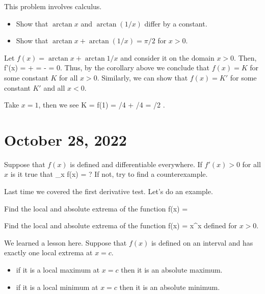 \documentclass[11pt]{amsart}
\begin{document}
\newpage

\begin{eg} 
This problem involves calculus. 
\begin{itemize}
\item Show that $\arctan x$ and $\arctan (1/x)$ differ by a constant. 
\item Show that $\arctan x + \arctan(1/x) = \pi/2$ for $x > 0$. 
\end{itemize} 
\end{eg} 

\newpage 

Let $f(x) = \arctan x + \arctan 1/x$ and consider it on the domain $x > 0$. 
Then, 
\beqn
f'(x) =  +  =  -  = 0.
\eeqn
Thus, by the corollary above we conclude that $f(x) = K$ for some constant $K$ for all $x > 0$. 
Similarly, we can show that $f(x) = K'$ for some constant $K'$ and all $x < 0$. 

Take $x = 1$, then we see
\beqn
K = f(1) = \pi/4 + \pi/4 = \pi/2 .
\eeqn 

\newpage

\section*{October 28, 2022} 

\begin{eg} 
Suppose that $f(x)$ is defined and differentiable everywhere. 
If $f'(x) > 0$ for all $x$ is it true that 
\beqn
\lim_{x \to \infty} f(x) = \infty ?
\eeqn
If not, try to find a counterexample. 
\end{eg} 

\vspace{5cm} 

Last time we covered the first derivative test.
Let's do an example. 
\begin{eg} 
Find the local and absolute extrema of the function 
\beqn
f(x) =  
\eeqn
\end{eg} 

\newpage 

\begin{eg} 
Find the local and absolute extrema of the function
\beqn
f(x) = x^x
\eeqn 
defined for $x > 0$. 
\end{eg} 
\vspace{5cm} 

We learned a lesson here.
Suppose that $f(x)$ is defined on an interval and has exactly one local extrema at $x = c$. 
\begin{itemize}
\item if it is a local maximum at $x=c$ then it is an absolute maximum. 
\item if it is a local minimum at $x=c$ then it is an absolute minimum. 
\end{itemize} 
\end{document}
